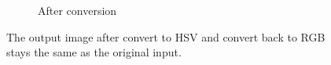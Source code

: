 \documentclass{article}
\begin{document}
\begin{itemize}
\begin{figure}[h]
\begin{subfigure}{.45\textwidth}
        \caption{After conversion}
      \end{subfigure}
    \caption{The output image after convert to HSV and convert back to RGB stays the same as the original input.}
    \end{figure}
\end{itemize}
\end{document}
